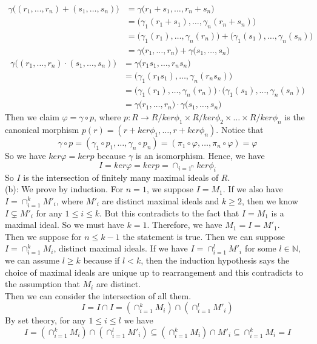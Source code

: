 \documentclass[12pt]{amsart}
\newcommand{\N}{\mathbb{N}}
\begin{document}
\begin{align*}
    \gamma\big((r_1,\dots,r_n)+(s_1,\dots,s_n)\big)&=\gamma\big(r_1+s_1,\dots,r_n+s_n\big)\\
    &=\big(\gamma_1(r_1+s_1),\dots,\gamma_n(r_n+s_n)\big)\\
    &=\big(\gamma_1(r_1),\dots,\gamma_n(r_n)\big)+\big(\gamma_1(s_1),\dots,\gamma_n(s_n)\big)\\
    &=\gamma\big(r_1,\dots,r_n\big)+\gamma\big(s_1,\dots,s_n\big)
\end{align*}
\begin{align*}
    \gamma\big((r_1,\dots,r_n)\cdot(s_1,\dots,s_n)\big)&=\gamma\big(r_1s_1,\dots,r_ns_n\big)\\
    &=\big(\gamma_1(r_1s_1),\dots,\gamma_n(r_ns_n)\big)\\
    &=\big(\gamma_1(r_1),\dots,\gamma_n(r_n)\big)\cdot\big(\gamma_1(s_1),\dots,\gamma_n(s_n)\big)\\
    &=\gamma\big(r_1,\dots,r_n\big)\cdot\gamma\big(s_1,\dots,s_n\big)
\end{align*}
Then we claim $\varphi=\gamma\circ p$, where $p:R\to R/ker\phi_1\times R/ker\phi_2\times \dots\times R/ker\phi_n$ is the canonical morphism $p(r)=(r+ker\phi_1,\dots,r+ker\phi_n)$. Notice that 
\[\gamma\circ p=(\gamma_1\circ p_1,\dots,\gamma_n\circ p_n)=(\pi_1\circ \varphi, \dots,\pi_n\circ \varphi)=\varphi \]
So we have $ker\varphi=kerp$ because $\gamma$ is an isomorphism. Hence, we have 
\[I=ker\varphi=kerp=\cap_{i=1^n}ker\phi_i\]
So $I$ is the intersection of finitely many maximal ideals of $R$.
\\(b): We prove by induction. For $n=1$, we suppose $I=M_1$. If we also have $I=\cap_{i=1}^kM'_i$, where $M'_i$ are distinct maximal ideals and $k\geq 2$, then we know $I\subsetneq M'_i$ for any $1\leq i\leq k$. But this contradicts to the fact that $I=M_1$ is a maximal ideal. So we must have $k=1$. Therefore, we have $M_1=I=M'_1$.\\
Then we suppose for $n\leq k-1$ the statement is true. Then we can suppose $I=\cap_{i=1}^k M_i$, distinct maximal ideals. If we have $I=\cap_{i=1}^l M'_i$ for some $l\in \N$, we can assume $l\geq k$ because if $l<k$, then the induction hypothesis says the choice of maximal ideals are unique up to rearrangement and this contradicts to the assumption that $M_i$ are distinct.\\
Then we can consider the intersection of all them.
\[I=I\cap I=(\cap_{i=1}^k M_i)\cap(\cap_{i=1}^l M'_i)\]
By set theory, for any $1\leq i \leq l$ we have 
\[I=(\cap_{i=1}^k M_i)\cap(\cap_{i=1}^l M'_i)\subseteq(\cap_{i=1}^k M_i)\cap M'_i\subseteq \cap_{i=1}^k M_i= I \]
\end{document}
